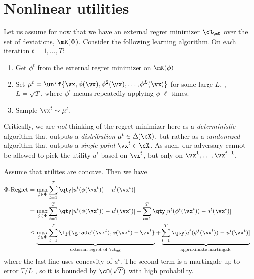 \section{Nonlinear utilities}

Let us assume for now that we have an external regret minimizer $\cR_\mK$ over the set of deviations, $\mK(\Phi)$. Consider the following learning algorithm. On each iteration $t = 1, \dots, T$:
\begin{enumerate}
    \item Get $\phi^t$ from the external regret minimizer on $\mK(\phi)$
    \item Set $\mu^t = \unif\{\vx, \phi(\vx), \phi^2(\vx), \dots, \phi^L(\vx)\}$ for some large $L$, \eg, $L = \sqrt{T}$, where $\phi^\ell$ means repeatedly applying $\phi$ $\ell$ times. 
    \item Sample $\vx^t \sim \mu^t$.
\end{enumerate}
Critically, we are {\em not} thinking of the regret minimizer here as a {\em deterministic} algorithm that outputs a {\em distribution} $\mu^t\in\Delta(\cX)$, but rather as a {\em randomized} algorithm that outputs a {\em single point} $\vx^t \in \cX$. As such, our adversary cannot be allowed to pick the utility $u^t$ based on $\vx^t$, but only on $\vx^1, \dots, \vx^{t-1}$.

Assume that utilites are concave. Then we have
\begin{align}
    \Phi\text{-Regret} &= \max_{\phi\in\Phi} \sum_{t=1}^T \qty[u^t(\phi(\vx^t)) - u^t(\vx^t)]
    \\&= \max_{\phi\in\Phi} \sum_{t=1}^T \qty[u^t(\phi(\vx^t)) - u^t(\vx^t)] + \sum_{t=1}^T \qty[u^t(\phi^t(\vx^t)) - u^t(\vx^t)]
    \\&\le \underbrace{\max_{\phi\in\Phi} \sum_{t=1}^T \ip{\grad u^t(\vx^t), \phi(\vx^t) - \vx^t}}_{\text{external regret of $\cR_\mK$}} + \underbrace{\sum_{t=1}^T \qty[u^t(\phi^t(\vx^t)) - u^t(\vx^t)]}_\text{approximate martingale}
\end{align}
where the last line uses concavity of $u^t$. The second term is a martingale up to error $T/L$ , so it is bounded by $\cO(\sqrt{T})$ with high probability.

